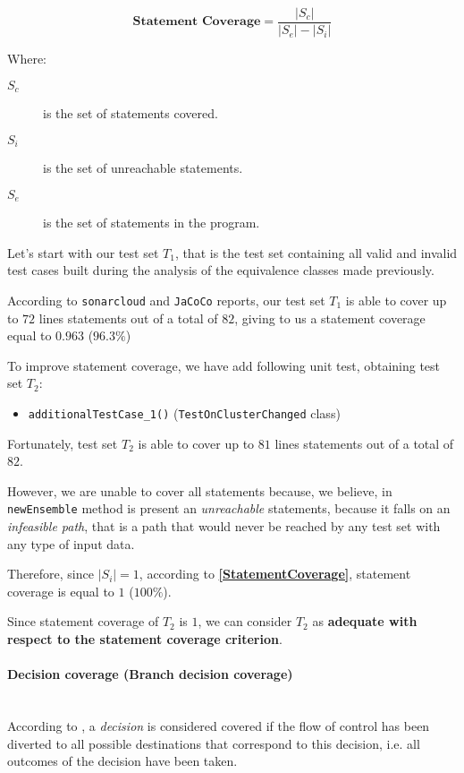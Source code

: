 \documentclass[sigconf]{acmart}
\newcommand{\abs}[1]{\left|#1\right|}
\begin{document}
\begin{equation} 
\label{StatementCoverage}
\textbf{Statement Coverage} = \dfrac{\abs{S_c}}{\abs{S_e} - \abs{S_i}}
\end{equation}

Where:
\begin{description}
\item[$S_c$] is the set of statements covered.
\item[$S_i$] is the set of unreachable statements.
\item[$S_e$] is the set of statements in the program.
\end{description}

Let's start with our test set $T_1$, that is the test set containing all valid and invalid test cases built during the analysis of the equivalence classes made previously.

According to \texttt{sonarcloud} and \texttt{JaCoCo} reports, our test set $T_1$ is able to cover up to $72$ lines statements out of a total of $82$, giving to us a statement coverage equal to $0.963$ ($96.3\%$)

To improve statement coverage, we have add following unit test, obtaining test set $T_2$:
\begin{itemize}
\item \texttt{additionalTestCase\_1()} (\texttt{TestOnClusterChanged} class)
\end{itemize}

Fortunately, test set $T_2$ is able to cover up to $81$ lines statements out of a total of $82$. 

However, we are unable to cover all statements because, we believe, in \texttt{newEnsemble} method is present an \textit{unreachable} statements, because it falls on an \textit{infeasible path}, that is a path that would never be reached by any test set with any type of input data. 

Therefore, since $\abs{S_i} = 1$, according to \textbf{\cref{StatementCoverage}}, statement coverage is equal to $1$ ($100\%$).

Since statement coverage of $T_2$ is $1$, we can consider $T_2$ as \textbf{adequate with respect to the statement coverage criterion}.

\paragraph{Decision coverage (Branch decision coverage)}
\hfill\\
According to \cite{AngelisBook}, a \textit{decision} is considered covered if the flow of control has been diverted to all possible destinations that correspond to this decision, i.e. all outcomes of the decision have been taken. 
\end{document}
